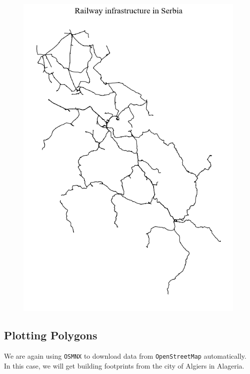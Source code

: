 \documentclass[
  letterpaper,
  DIV=11,
  numbers=noendperiod]{scrreprt}
\begin{document}
\begin{figure}[H]

{\centering \includegraphics{labs/w02_maps_files/figure-pdf/cell-14-output-2.png}

}

\end{figure}

\hypertarget{plotting-polygons}{%
\subsection{Plotting Polygons}\label{plotting-polygons}}

We are again using \texttt{OSMNX} to download data from
\texttt{OpenStreetMap} automatically. In this case, we will get building
footprints from the city of Algiers in Alageria.
\end{document}
